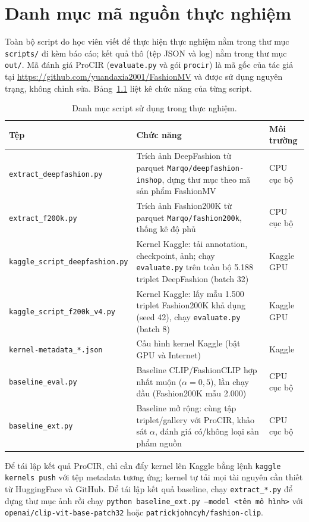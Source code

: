 \chapter{Danh mục mã nguồn thực nghiệm}\label{chapter:appendix-code}
\pagestyle{fancy}

Toàn bộ script do học viên viết để thực hiện thực nghiệm nằm trong thư mục \texttt{scripts/} đi kèm báo cáo; kết quả thô (tệp JSON và log) nằm trong thư mục \texttt{out/}. Mã đánh giá ProCIR (\texttt{evaluate.py} và gói \texttt{procir}) là mã gốc của tác giả tại \url{https://github.com/yuandaxia2001/FashionMV} và được sử dụng nguyên trạng, không chỉnh sửa. Bảng~\ref{tab:scripts} liệt kê chức năng của từng script.

\begin{table}[h]
\centering
\caption{Danh mục script sử dụng trong thực nghiệm.}
\label{tab:scripts}
\small
\begin{tabular}{p{4.6cm}p{6.4cm}l}
\toprule
Tệp & Chức năng & Môi trường \\
\midrule
\texttt{extract\_deepfashion.py} & Trích ảnh DeepFashion từ parquet \texttt{Marqo/deepfashion-inshop}, dựng thư mục theo mã sản phẩm FashionMV & CPU cục bộ \\
\texttt{extract\_f200k.py} & Trích ảnh Fashion200K từ parquet \texttt{Marqo/fashion200k}, thống kê độ phủ & CPU cục bộ \\
\texttt{kaggle\_script\_deepfashion.py} & Kernel Kaggle: tải annotation, checkpoint, ảnh; chạy \texttt{evaluate.py} trên toàn bộ 5.188 triplet DeepFashion (batch 32) & Kaggle GPU \\
\texttt{kaggle\_script\_f200k\_v4.py} & Kernel Kaggle: lấy mẫu 1.500 triplet Fashion200K khả dụng (seed 42), chạy \texttt{evaluate.py} (batch 8) & Kaggle GPU \\
\texttt{kernel-metadata\_*.json} & Cấu hình kernel Kaggle (bật GPU và Internet) & Kaggle \\
\texttt{baseline\_eval.py} & Baseline CLIP/FashionCLIP hợp nhất muộn ($\alpha = 0{,}5$), lần chạy đầu (Fashion200K mẫu 2.000) & CPU cục bộ \\
\texttt{baseline\_ext.py} & Baseline mở rộng: cùng tập triplet/gallery với ProCIR, khảo sát $\alpha$, đánh giá có/không loại sản phẩm nguồn & CPU cục bộ \\
\bottomrule
\end{tabular}
\end{table}

Để tái lập kết quả ProCIR, chỉ cần đẩy kernel lên Kaggle bằng lệnh \texttt{kaggle kernels push} với tệp metadata tương ứng; kernel tự tải mọi tài nguyên cần thiết từ HuggingFace và GitHub. Để tái lập kết quả baseline, chạy \texttt{extract\_*.py} để dựng thư mục ảnh rồi chạy \texttt{python baseline\_ext.py --model <tên mô hình>} với \texttt{openai/clip-vit-base-patch32} hoặc \texttt{patrickjohncyh/fashion-clip}.
